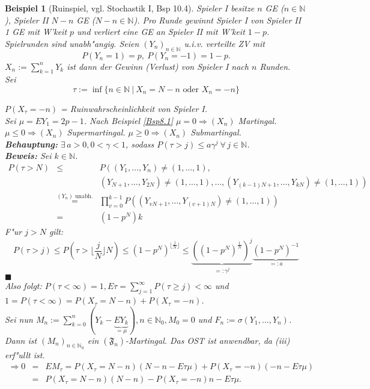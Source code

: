 \documentclass[a4paper,11pt]{book}
\newcommand{\N}{{\mathbb N}}
\def\FF{ \mathfrak{F} }
\newtheorem{Bsp}{Beispiel}[chapter]
\theoremstyle{nonumberplain}
\begin{document}
\begin{Bsp}[Ruinspiel, vgl. Stochastik I, Bsp 10.4] \label{Bsp8.7}
Spieler I besitze $n$ GE ($n \in \N$), Spieler II $N-n$ GE ($N-n \in \N$). Pro Runde gewinnt Spieler I von Spieler II 1 GE mit W'keit $p$ und verliert eine GE an Spieler II mit W'keit $1-p$. Spielrunden sind unabh"angig. Seien $(Y_n)_{n \in \N}$ u.i.v. verteilte ZV mit
\[
P(Y_n = 1) = p,\ P(Y_n = -1) = 1-p.
\]
$X_n := \sum\limits_{k=1}^n Y_k$ ist dann der Gewinn (Verlust) von Spieler I nach $n$ Runden.\\
Sei
\[
\tau := \inf\{ n \in \N\ |\ X_n = N-n \text{ oder } X_n = -n \}
\]

$P(X_{\tau} = -n)$ = Ruinwahrscheinlichkeit von Spieler I.\\
Sei $\mu = EY_1 = 2p -1$. Nach Beispiel \ref{Bsp8.1} $\mu = 0 \Rightarrow (X_n)$ Martingal. $\mu \leq 0 \Rightarrow (X_n)$ Supermartingal. $\mu \geq 0 \Rightarrow (X_n)$ Submartingal.\\
\textbf{Behauptung:} $\exists\, a > 0, 0 < \gamma < 1$, sodass $P(\tau > j) \leq a \gamma^j \ \forall\, j \in \N$.\\
\textbf{Beweis:} Sei $k \in \N$.
\begin{eqnarray*}
P(\tau > N) & \leq & P\left( (Y_1,\dots,Y_n) \not= (1,\dots,1) , \right. \\
& & \left. (Y_{N+1},\dots,Y_{2N}) \not= (1,\dots,1) , \dots, (Y_{(k-1)N+1},\dots,Y_{kN}) \not= (1,\dots,1) \right) \\
& \stackrel{(Y_n) \text{ unabh.}}{=} & \prod_{v = 0}^{k-1} P\left( (Y_{vN+1},\dots,Y_{(v+1)N}) \not= (1,\dots,1) \right)\\
& = & (1-p^N)k
\end{eqnarray*}
F"ur $j > N$ gilt:
\[
P(\tau > j) \leq P( \tau > \lfloor \frac{j}{N} \rfloor N) \leq (1-p^N)^{\lfloor \frac{j}{N} \rfloor} \leq \underbrace{\left( (1-p^N)^{\frac1{N}} \right)^j}_{=: \gamma^j} \underbrace{(1-p^N)^{-1}}_{=: a}
\]
\hfill $\blacksquare$ \\
Also folgt: $P(\tau < \infty) = 1, E\tau = \sum\limits_{j=1}^{\infty} P(\tau \geq j) < \infty$ und $1 = P(\tau < \infty) = P(X_{\tau} = N-n) + P(X_{\tau} = -n)$.\\
Sei nun $M_n := \sum\limits_{k=0}^n (Y_k - \underbrace{EY_k}_{=\mu}), n \in \N_0, M_0 = 0$ und $F_n := \sigma(Y_1,\dots,Y_n)$.\\
Dann ist $(M_n)_{n \in \N_0}$ ein $(\FF_n)$-Martingal. Das OST ist anwendbar, da (iii) erf"ullt ist.
\begin{eqnarray*}
\Rightarrow 0 & = & EM_{\tau} = P(X_{\tau} = N-n) (N-n-E\tau \mu) + P(X_{\tau} = -n)(-n-E\tau \mu) \\
& = & P(X_{\tau} = N-n)(N-n) - P(X_{\tau} = -n)n -E\tau \mu.
\end{eqnarray*}


\end{Bsp}
\end{document}
